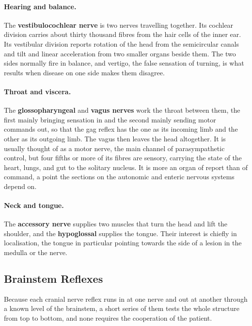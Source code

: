 \documentclass[11pt]{article}
\begin{document}
\paragraph{Hearing and balance.} The \textbf{vestibulocochlear nerve} is two nerves travelling together. Its cochlear division carries about thirty thousand fibres from the hair cells of the inner ear. Its vestibular division reports rotation of the head from the semicircular canals and tilt and linear acceleration from two smaller organs beside them. The two sides normally fire in balance, and vertigo, the false sensation of turning, is what results when disease on one side makes them disagree.

\paragraph{Throat and viscera.} The \textbf{glossopharyngeal} and \textbf{vagus nerves} work the throat between them, the first mainly bringing sensation in and the second mainly sending motor commands out, so that the gag reflex has the one as its incoming limb and the other as its outgoing limb. The vagus then leaves the head altogether. It is usually thought of as a motor nerve, the main channel of parasympathetic control, but four fifths or more of its fibres are sensory, carrying the state of the heart, lungs, and gut to the solitary nucleus. It is more an organ of report than of command, a point the sections on the autonomic and enteric nervous systems depend on.

\paragraph{Neck and tongue.} The \textbf{accessory nerve} supplies two muscles that turn the head and lift the shoulder, and the \textbf{hypoglossal} supplies the tongue. Their interest is chiefly in localisation, the tongue in particular pointing towards the side of a lesion in the medulla or the nerve.

\subsection{Brainstem Reflexes}

Because each cranial nerve reflex runs in at one nerve and out at another through a known level of the brainstem, a short series of them tests the whole structure from top to bottom, and none requires the cooperation of the patient.
\end{document}
